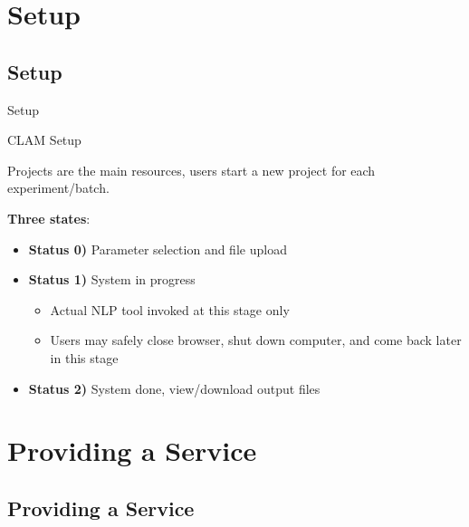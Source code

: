 \documentclass[compress]{beamer}
\begin{document}
\section{Setup}

\subsection{Setup}

\begin{frame}{Setup}
    \begin{block}{CLAM Setup}

            Projects are the main resources, users start a new project for each experiment/batch.
    
            \textbf{Three states}:

            \begin{itemize}
                \item \textbf{Status 0)} Parameter selection and file upload
                \item \textbf{Status 1)} System in progress
                \begin{itemize}
                    \item Actual NLP tool invoked at this stage only
                    \item Users may safely close browser, shut down computer, and come back later in this stage
                \end{itemize}
                \item \textbf{Status 2)} System done, view/download output files
            \end{itemize}


    \end{block}
\end{frame}

\section{Providing a Service}

\subsection{Providing a Service}
\end{document}
